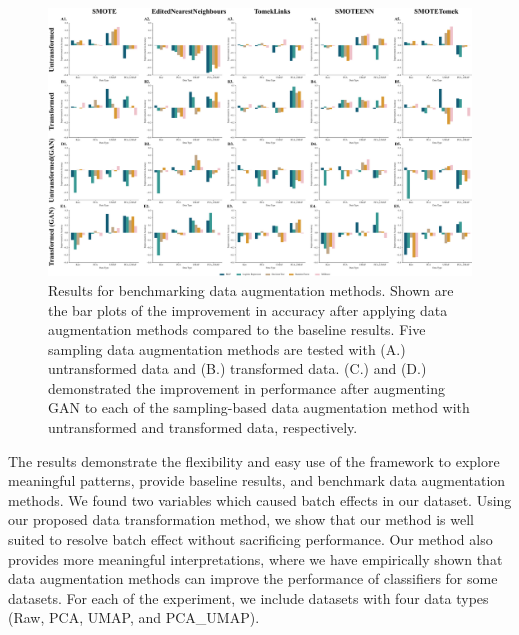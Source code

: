 \begin{figure}[t!]
    \centering
    \includegraphics[width=\linewidth]{Figures/Figure5.pdf}
    \caption{Results for benchmarking data augmentation methods. Shown are the bar plots of the improvement in accuracy after applying data augmentation methods compared to the baseline results. Five sampling data augmentation methods are tested with (A.) untransformed data and (B.) transformed data. (C.) and (D.) demonstrated the improvement in performance after augmenting GAN to each of the sampling-based data augmentation method with untransformed and transformed data, respectively.}
    \label{fig:figure5}
\end{figure}

The results demonstrate the flexibility and easy use of the framework to explore meaningful patterns, provide baseline results, and benchmark data augmentation methods. We found two variables which caused batch effects in our dataset. Using our proposed data transformation method, we show that our method is well suited to resolve batch effect without sacrificing performance. Our method also provides more meaningful interpretations, where we have empirically shown that data augmentation methods can improve the performance of classifiers for some datasets. For each of the experiment, we include datasets with four data types (Raw, PCA, UMAP, and PCA\_UMAP).

